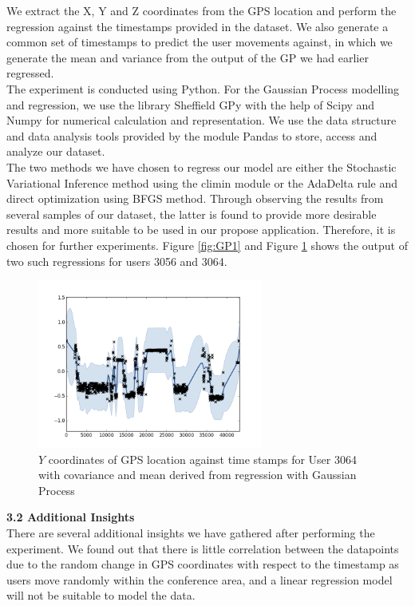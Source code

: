 \documentclass[letterpaper]{article}
\begin{document}
We extract the X, Y and Z coordinates from the GPS location and perform the regression against the timestamps provided in the dataset. We also generate a common set of timestamps to predict the user movements against, in which we generate the mean and variance from the output of the GP we had earlier regressed. \\

The experiment is conducted using Python. For the Gaussian Process modelling and regression, we use the library Sheffield GPy with the help of Scipy and Numpy for numerical calculation and representation. We use the data structure and data analysis tools provided by the module Pandas to store, access and analyze our dataset. \\

The two methods we have chosen to regress our model are either the Stochastic Variational Inference method using the climin module or the AdaDelta rule and direct optimization using BFGS method. Through observing the results from several samples of our dataset, the latter is found to provide more desirable results and more suitable to be used in our propose application. Therefore, it is chosen for further experiments. Figure \ref{fig:GP1} and Figure \ref{fig:GP2} shows the output of two such regressions for users 3056 and 3064. \\

\begin{figure}[h!]
  \centering
    \includegraphics[width=280px,natwidth=634,natheight=442]{selected_GP/3064.csv_Y.png}
  \caption{$Y$ coordinates of GPS location against time stamps for User 3064 with covariance and mean derived from regression with Gaussian Process}
  \label{fig:GP2}
\end{figure}

{\bf3.2  Additional Insights} \\

There are several additional insights we have gathered after performing the experiment. We found out that there is little correlation between the datapoints due to the random change in GPS coordinates with respect to the timestamp as users move randomly within the conference area, and a linear regression model will not be suitable to model the data. \\
\end{document}
